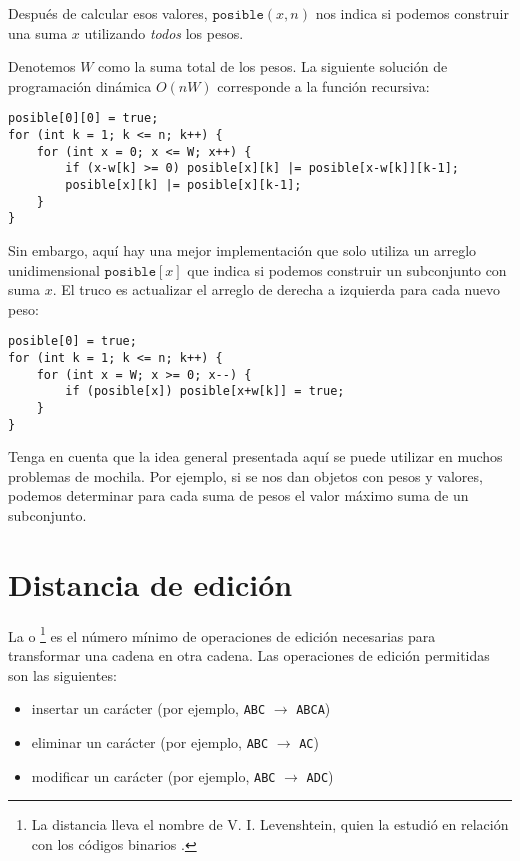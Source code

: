 Después de calcular esos valores, $\texttt{posible}(x,n)$
nos indica si podemos construir una
suma $x$ utilizando \emph{todos} los pesos.

Denotemos $W$ como la suma total de los pesos.
La siguiente solución de programación dinámica $O(nW)$
corresponde a la función recursiva:
\begin{lstlisting}
posible[0][0] = true;
for (int k = 1; k <= n; k++) {
    for (int x = 0; x <= W; x++) {
        if (x-w[k] >= 0) posible[x][k] |= posible[x-w[k]][k-1];
        posible[x][k] |= posible[x][k-1];
    }
}
\end{lstlisting}

Sin embargo, aquí hay una mejor implementación que solo utiliza
un arreglo unidimensional $\texttt{posible}[x]$
que indica si podemos construir un subconjunto con suma $x$.
El truco es actualizar el arreglo de derecha a izquierda para
cada nuevo peso:
\begin{lstlisting}
posible[0] = true;
for (int k = 1; k <= n; k++) {
    for (int x = W; x >= 0; x--) {
        if (posible[x]) posible[x+w[k]] = true;
    }
}
\end{lstlisting}

Tenga en cuenta que la idea general presentada aquí se puede utilizar
en muchos problemas de mochila.
Por ejemplo, si se nos dan objetos con pesos y valores,
podemos determinar para cada suma de pesos el valor máximo
suma de un subconjunto.

\section{Distancia de edición}


La  o \footnote{La distancia
lleva el nombre de V. I. Levenshtein, quien la estudió en relación con los códigos binarios \cite{lev66}.}
es el número mínimo de operaciones de edición
necesarias para transformar una cadena
en otra cadena.
Las operaciones de edición permitidas son las siguientes:
\begin{itemize}
\item insertar un carácter (por ejemplo, \texttt{ABC} $\rightarrow$ \texttt{ABCA})
\item eliminar un carácter (por ejemplo, \texttt{ABC} $\rightarrow$ \texttt{AC})
\item modificar un carácter (por ejemplo, \texttt{ABC} $\rightarrow$ \texttt{ADC})
\end{itemize}

